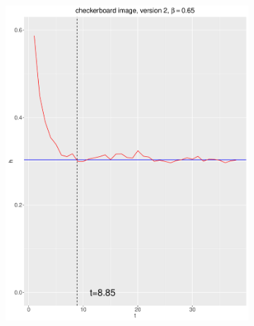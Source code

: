 \documentclass[12pt, oneside]{article}   	%
\begin{document}
\begin{figure}[H]
\begin{subfigure}[b]{0.475\textwidth}
            \includegraphics[width=\textwidth, height=0.32\textheight]{check_v2_65.pdf}
        \end{subfigure} \\
        \centering
        \begin{subfigure}[b]{0.475\textwidth}
            \centering

\end{subfigure}
\end{figure}
\end{document}
